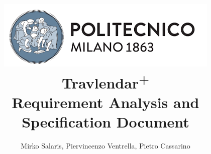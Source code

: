 \begin{titlepage}

\title{
		\includegraphics[scale=0.5]{Images/PolimiLogo}
		\bigskip
		\Huge{\textbf{\\Travlendar\textsuperscript{+}}}\\
		\LARGE{\bigskip Requirement Analysis and Specification Document}
		}
\author{Mirko Salaris, 
		Piervincenzo Ventrella, 
		Pietro Cassarino
}

\maketitle
\thispagestyle{empty}

\end{titlepage}